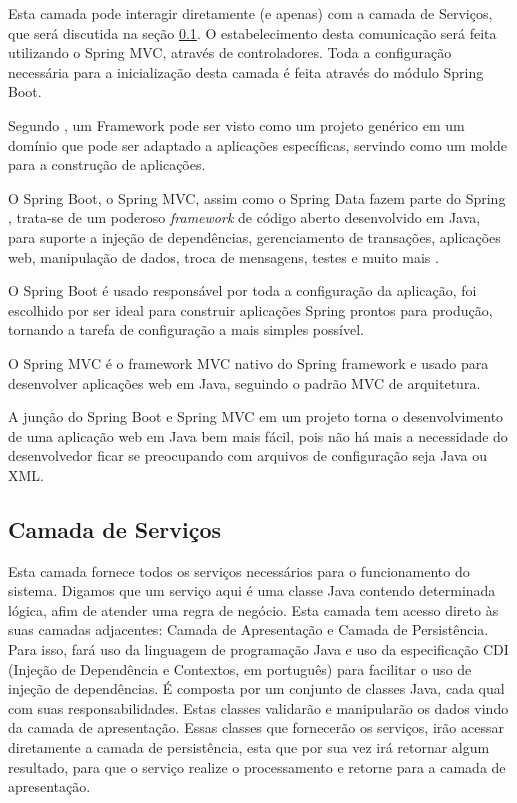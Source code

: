 \documentclass[a4paper,12pt]{monografia}
\begin{document}
Esta camada pode interagir diretamente (e apenas) com a camada de Serviços, que será discutida na seção \ref{sub:camada_de_servicos}. O estabelecimento desta comunicação será feita utilizando o Spring MVC, através de controladores. Toda a configuração necessária para a inicialização desta camada é feita através do  módulo Spring Boot.

Segundo , um Framework pode ser visto como um projeto genérico em um domínio que pode ser adaptado a aplicações específicas, servindo como um molde para a construção de aplicações.

O Spring Boot, o Spring MVC, assim como o Spring Data fazem parte do Spring , trata-se de um poderoso \textit{framework}  de código aberto desenvolvido em Java, para suporte a injeção de dependências, gerenciamento de transações, aplicações web, manipulação de dados, troca de mensagens, testes e muito mais \cite{Spring}. 

O Spring Boot é usado responsável por toda a configuração da aplicação, foi escolhido por ser ideal para construir aplicações Spring prontos para produção, tornando a tarefa de configuração a mais simples possível. 

O Spring MVC é o framework MVC nativo do Spring framework e usado para desenvolver aplicações web em Java, seguindo o padrão MVC de arquitetura.

A junção do Spring Boot e Spring MVC em um projeto torna o desenvolvimento de uma aplicação web em Java bem mais fácil, pois não há mais a necessidade do desenvolvedor ficar se preocupando com arquivos de configuração seja Java ou XML.

\subsection{Camada de Serviços} %
\label{sub:camada_de_servicos}

Esta camada fornece todos os serviços necessários para o funcionamento do sistema. Digamos que um serviço aqui é uma classe Java contendo determinada lógica, afim de atender uma regra de negócio. Esta camada tem acesso direto às suas camadas adjacentes: Camada de Apresentação e Camada de Persistência. Para isso, fará uso da linguagem de programação Java e uso da especificação CDI (Injeção de Dependência e Contextos, em português) para facilitar o uso de injeção de dependências. É composta por um conjunto de classes Java, cada qual com suas responsabilidades. Estas classes validarão e manipularão os dados vindo da camada de apresentação. Essas classes que fornecerão os serviços, irão acessar diretamente a camada de persistência, esta que por sua vez irá retornar algum resultado, para que o serviço realize o processamento e retorne para a camada de apresentação.
\end{document}
